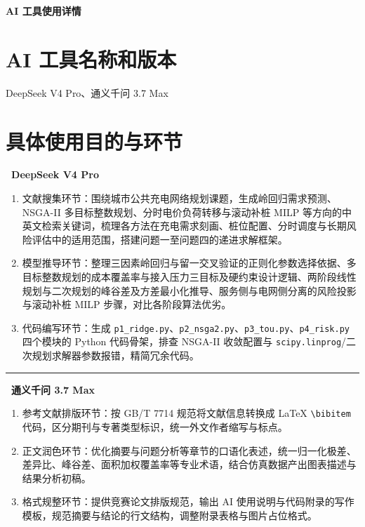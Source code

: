 \documentclass[12pt,a4paper]{ctexart}
\begin{document}
\begin{center}
{\heiti\bfseries AI 工具使用详情}
\end{center}

\section{AI 工具名称和版本}

DeepSeek V4 Pro、通义千问 3.7 Max

\section{具体使用目的与环节}

\noindent\textbf{\textbullet~DeepSeek V4 Pro}

\begin{enumerate}[label=(\arabic*)]
  \item 文献搜集环节：围绕城市公共充电网络规划课题，生成岭回归需求预测、NSGA-II 多目标整数规划、分时电价负荷转移与滚动补桩 MILP 等方向的中英文检索关键词，梳理各方法在充电需求刻画、桩位配置、分时调度与长期风险评估中的适用范围，搭建问题一至问题四的递进求解框架。
  \item 模型推导环节：整理三因素岭回归与留一交叉验证的正则化参数选择依据、多目标整数规划的成本覆盖率与接入压力三目标及硬约束设计逻辑、两阶段线性规划与二次规划的峰谷差及方差最小化推导、服务侧与电网侧分离的风险投影与滚动补桩 MILP 步骤，对比各阶段算法优劣。
  \item 代码编写环节：生成 \texttt{p1\_ridge.py}、\texttt{p2\_nsga2.py}、\texttt{p3\_tou.py}、\texttt{p4\_risk.py} 四个模块的 Python 代码骨架，排查 NSGA-II 收敛配置与 \verb|scipy.linprog|/二次规划求解器参数报错，精简冗余代码。
\end{enumerate}

\noindent\rule{\linewidth}{0.4pt}

\noindent\textbf{\textbullet~通义千问 3.7 Max}

\begin{enumerate}[label=(\arabic*)]
  \item 参考文献排版环节：按 GB/T 7714 规范将文献信息转换成 LaTeX \verb|\bibitem| 代码，区分期刊与专著类型标识，统一外文作者缩写与标点。
  \item 正文润色环节：优化摘要与问题分析等章节的口语化表述，统一归一化极差、差异比、峰谷差、面积加权覆盖率等专业术语，结合仿真数据产出图表描述与结果分析初稿。
  \item 格式规整环节：提供竞赛论文排版规范，输出 AI 使用说明与代码附录的写作模板，规范摘要与结论的行文结构，调整附录表格与图片占位格式。
\end{enumerate}
\end{document}
